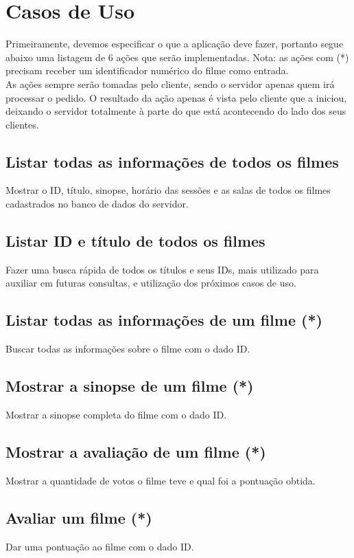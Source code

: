 \documentclass[11pt,twoside]{article}
\begin{document}
\section{Casos de Uso}
Primeiramente, devemos especificar o que a aplicação deve fazer, portanto segue abaixo uma listagem de 6 ações que serão implementadas. Nota: as ações com (*) precisam receber um identificador numérico do filme como entrada.\\
As ações sempre serão tomadas pelo cliente, sendo o servidor apenas quem irá processar o pedido. O resultado da ação apenas é vista pelo cliente que a iniciou, deixando o servidor totalmente à parte do que está acontecendo do lado dos seus clientes.
\subsection{Listar todas as informações de todos os filmes}
Mostrar o ID, título, sinopse, horário das sessões e as salas de todos os filmes cadastrados no banco de dados do servidor.
\subsection{Listar ID e título de todos os filmes}
Fazer uma busca rápida de todos os títulos e seus IDs, mais utilizado para auxiliar em futuras consultas, e utilização dos próximos casos de uso.
\subsection{Listar todas as informações de um filme (*)}
Buscar todas as informações sobre o filme com o dado ID.
\subsection{Mostrar a sinopse de um filme (*)}
Mostrar a sinopse completa do filme com o dado ID.
\subsection{Mostrar a avaliação de um filme (*)}
Mostrar a quantidade de votos o filme teve e qual foi a pontuação obtida.
\subsection{Avaliar um filme (*)}
Dar uma pontuação ao filme com o dado ID.
\end{document}
